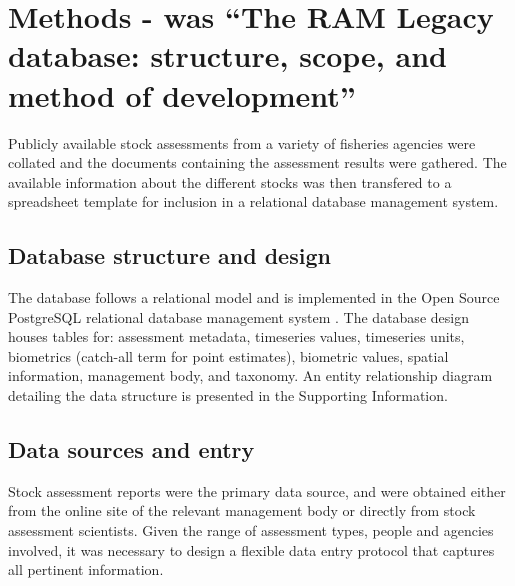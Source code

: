\documentclass[letterpaper,12pt]{article}
\begin{document}
\newpage
\section{Methods - was ``The RAM Legacy database: structure, scope, and method of development''}

Publicly available stock assessments from a variety of fisheries
agencies were collated and the documents containing the assessment
results were gathered. The available information about the different
stocks was then transfered to a spreadsheet template for inclusion in
a relational database management system.

\subsection{Database structure and design}
The database follows a relational model and is implemented in the Open
Source PostgreSQL relational database management system \citep{postgresql:2009}. The database design houses tables
for: assessment metadata, timeseries values, timeseries units,
biometrics (catch-all term for point estimates), biometric values,
spatial information, management body, and taxonomy. An entity
relationship diagram detailing the data structure is presented in the
Supporting Information.

\subsection{Data sources and entry}
Stock assessment reports were the primary data source, and were
obtained either from the online site of the relevant management body
or directly from stock assessment scientists. Given the range of
assessment types, people and agencies involved, it was necessary to
design a flexible data entry protocol that captures all pertinent
information.
\end{document}
